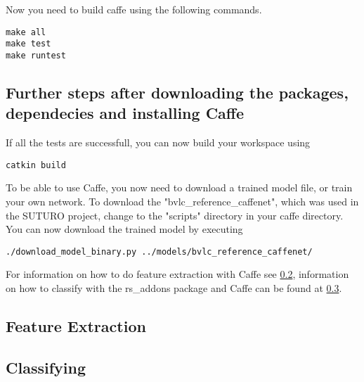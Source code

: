 \documentclass[main.tex]{subfiles}
\begin{document}
 	
Now you need to build caffe using the following commands.
\begin{lstlisting}
make all
make test
make runtest  
\end{lstlisting}

\subsection{Further steps after downloading the packages, dependecies and installing Caffe}


If all the tests are successfull, you can now build your workspace using
\begin{lstlisting}
catkin build
\end{lstlisting}

To be able to use Caffe, you now need to download a trained model file, or train your own network. To download the "bvlc\_reference\_caffenet", which was used in the SUTURO project, change to the "scripts" directory in your caffe directory. You can now download the trained model by executing

\begin{lstlisting}
./download_model_binary.py ../models/bvlc_reference_caffenet/
\end{lstlisting}



For information on how to do feature extraction with Caffe see \ref{feature_extraction}, information on how to classify with the rs\_addons package and Caffe can be found at \ref{classifying}. 

\subsection{Feature Extraction} \label{feature_extraction}

\subsection{Classifying} \label{classifying}
 
\end{document}
